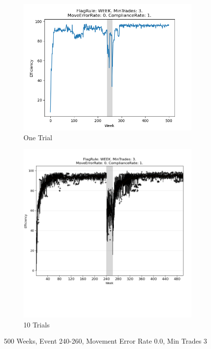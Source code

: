 \documentclass{article}%
\begin{document}
%


\begin{figure}[!htb]%
\begin{subfigure}[b]{0.45\linewidth}%
\includegraphics[width=\linewidth]{2030fr_WEEK_mt_3_er_0_cr_1_t1.png}%
\caption{One Trial}%
\end{subfigure}%
\begin{subfigure}[b]{0.45\linewidth}%
\includegraphics[clip,width=\linewidth,trim=0 4cm 0 0]{2030fr_WEEK_mt_3_er_0_cr_1_t10.png}%
\caption{10 Trials}%
\end{subfigure}%
\caption{500 Weeks, Event 240{-}260, Movement Error Rate 0.0, Min Trades 3}%
\end{figure}
\end{document}
